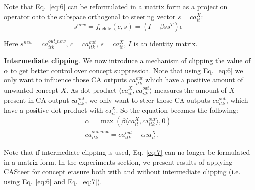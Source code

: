 Note that Eq.~\ref{eq:6} can be reformulated in a matrix form as a projection operator onto the subspace orthogonal to steering vector $s=ca^{X}_{it}$:
\begin{equation}
    s^{new} = f_{\text{delete}}(c, s) = (I - \beta ss^T)c 
    \label{eq:casteer_erasure_matrix}
\end{equation}

Here $s^{new}=ca^{out\_new}_{itk}$, $c=ca^{out}_{itk}$, $s=ca^{X}_{it}$, $I$ is an identity matrix. 

\noindent \textbf{Intermediate clipping}. We now introduce a mechanism of clipping the value of $\alpha$ to get better control over concept suppression. Note that using Eq.~\ref{eq:6} we only want to influence those CA outputs $ca^{out}_{itk}$ which have a positive amount of unwanted concept $X$. As dot product $ \langle ca^{X}_{it}, ca^{out}_{itk} \rangle$ measures the amount of $X$ present in CA output $ca^{out}_{itk}$, we only want to steer those CA outputs $ca^{out}_{itk}$, which have a positive dot product with $ca^{X}_{it}$. So the equation becomes the following:
\begin{equation}
\begin{split}
\label{eq:7}
    \alpha = \max(\beta \langle ca^{X}_{it}, ca^{out}_{itk}\rangle, 0) \\
    ca^{out\_new}_{itk} = ca^{out}_{itk}- \alpha ca^{X}_{it}.
\end{split}
\end{equation}  

Note that if intermediate clipping is used, Eq.~\ref{eq:7} can no longer be formulated in a matrix form. In the experiments section, we present results of applying CASteer for concept erasure both with and without intermediate clipping (i.e. using Eq.~\ref{eq:6} and Eq.~\ref{eq:7}).

